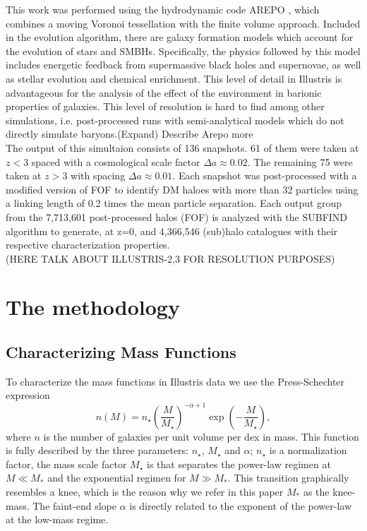 \documentclass[a4paper,fleqn,usenatbib]{mnras}
\begin{document}
This work was  performed using the hydrodynamic code AREPO
\cite{Arepo}, which combines a moving Voronoi tessellation with the
finite volume approach. Included in the evolution algorithm, there are
galaxy formation models which account for the evolution of stars and
SMBHs. Specifically, the physics followed by this model includes
energetic feedback from supermassive black holes and supernovae, as
well as stellar evolution and chemical enrichment. This level of
detail in Illustris is advantageous for the analysis of the effect of
the environment in barionic properties of galaxies. This level of resolution is hard to find
among other simulations, i.e. post-processed runs with semi-analytical
models which do not directly simulate baryons.(Expand) Describe Arepo more\\ 

The output of this simultaion consists of 136 snapshots. 61 of
them were taken at $z < 3$ spaced with a cosmological scale factor
$\Delta a \approx 0.02$. The remaining 75 were taken at $z > 3$
with spacing $\Delta a \approx 0.01$. Each snapshot was post-processed
with a modified version of FOF \cite{FOF} to identify DM haloes with
more than 32 particles using a linking length of 0.2 times the mean
particle separation. Each output group from the 7,713,601 post-processed halos (FOF) is analyzed with the SUBFIND
algorithm \cite{SUBFIND} to generate, at z=0,
and 4,366,546 (sub)halo catalogues with their respective
characterization properties. \\ 

(HERE TALK ABOUT ILLUSTRIS-2,3 FOR RESOLUTION PURPOSES)

\section{The methodology}

\subsection{Characterizing Mass Functions}

To characterize the mass functions in Illustris data we use
the Press-Schechter expression
\begin{equation}
n(M) = n_\star\left( \frac{M}{M_\star} \right)^{-\alpha+1}\exp \left( -\frac{M}{M_\star}\right),
\label{eq:Schechter}
\end{equation}
%
where $n$ is the number of galaxies per unit volume per dex in mass.
This function is fully described by the three parameters: $n_\star$,
$M_\star$ and $\alpha$; $n_\star$ is a normalization factor, the mass
scale factor $M_\star$ is that separates the power-law regimen at
$M\ll M_*$ and the exponential regimen for $M \gg M_*$. 
This transition graphically resembles a knee, which is the reason why
we refer in this paper $M_*$ as the knee-mass.
The faint-end slope $\alpha$ is directly related to the exponent of
the power-law at the low-mass regime. 
\end{document}
